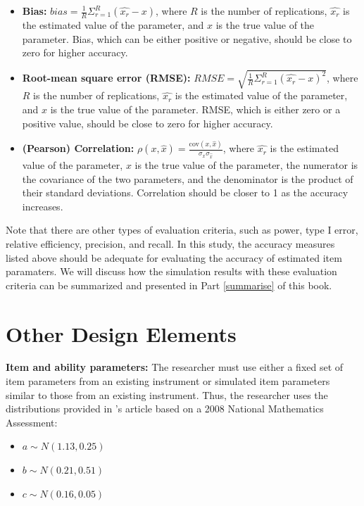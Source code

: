 \documentclass[
]{book}
\providecommand{\tightlist}{%
  \setlength{\itemsep}{0pt}\setlength{\parskip}{0pt}}
\begin{document}
\begin{itemize}
\item
  \textbf{Bias:} \(bias = \frac{1}{R} \Sigma_{r=1}^{R} (\hat{x_r}-x)\), where \(R\) is the number of replications, \(\hat{x_r}\) is the estimated value of the parameter, and \(x\) is the true value of the parameter. Bias, which can be either positive or negative, should be close to zero for higher accuracy.
\item
  \textbf{Root-mean square error (RMSE):} \(RMSE = \sqrt{\frac{1}{R} \Sigma_{r=1}^{R} (\hat{x_r}-x)^2}\), where \(R\) is the number of replications, \(\hat{x_r}\) is the estimated value of the parameter, and \(x\) is the true value of the parameter. RMSE, which is either zero or a positive value, should be close to zero for higher accuracy.
\item
  \textbf{(Pearson) Correlation:} \(\rho(x,\hat{x}) = \frac{\text{cov}(x,\hat{x})}{\sigma_x \sigma_{\hat{x}}}\), where \(\hat{x_r}\) is the estimated value of the parameter, \(x\) is the true value of the parameter, the numerator is the covariance of the two parameters, and the denominator is the product of their standard deviations. Correlation should be closer to 1 as the accuracy increases.
\end{itemize}

Note that there are other types of evaluation criteria, such as power, type I error, relative efficiency, precision, and recall. In this study, the accuracy measures listed above should be adequate for evaluating the accuracy of estimated item paramaters. We will discuss how the simulation results with these evaluation criteria can be summarized and presented in Part \ref{summarise} of this book.

\hypertarget{other-design-elements}{%
\section{Other Design Elements}\label{other-design-elements}}

\textbf{Item and ability parameters:} The researcher must use either a fixed set of item parameters from an existing instrument or simulated item parameters similar to those from an existing instrument. Thus, the researcher uses the distributions provided in \citet{casa2015}'s article based on a 2008 National Mathematics Assessment:

\begin{itemize}
\tightlist
\item
  \(a \sim N(1.13, 0.25)\)
\item
  \(b \sim N(0.21, 0.51)\)
\item
  \(c \sim N(0.16, 0.05)\)
\end{itemize}
\end{document}
